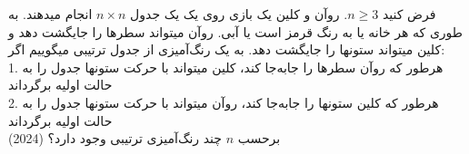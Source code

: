فرض کنید $n \ge 3$. روآن و کلین یک بازی روی یک یک جدول $n \times n$ انجام میدهند.
به طوری که هر خانه یا به رنگ قرمز است یا آبی.
روآن میتواند سطرها را جایگشت دهد و کلین میتواند ستونها را جایگشت دهد.
به یک رنگ‌آمیزی از جدول ترتیبی میگوییم اگر:\\
1. هرطور که روآن سطرها را جابه‌جا کند، کلین میتواند با حرکت ستونها جدول را به حالت اولیه برگرداند
\\
2. هرطور که کلین ستونها را جابه‌جا کند، روآن میتواند با حرکت ستونها جدول را به حالت اولیه برگرداند\\
برحسب $n$ چند رنگ‌آمیزی ترتیبی وجود دارد؟
(2024)